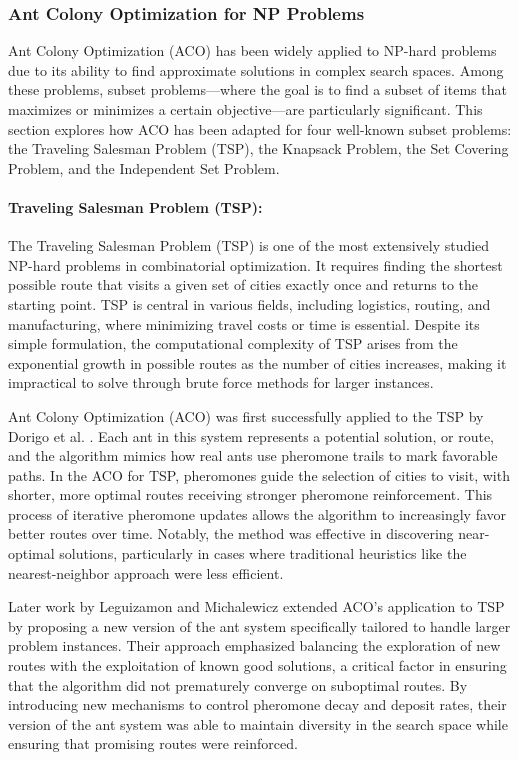 \subsubsection*{Ant Colony Optimization for NP Problems}
Ant Colony Optimization (ACO) has been widely applied to NP-hard problems due to its ability to find approximate solutions in complex search spaces. Among these problems, subset problems—where the goal is to find a subset of items that maximizes or minimizes a certain objective—are particularly significant. This section explores how ACO has been adapted for four well-known subset problems: the Traveling Salesman Problem (TSP), the Knapsack Problem, the Set Covering Problem, and the Independent Set Problem.

\paragraph{Traveling Salesman Problem (TSP):}
The Traveling Salesman Problem (TSP) is one of the most extensively studied NP-hard problems in combinatorial optimization. It requires finding the shortest possible route that visits a given set of cities exactly once and returns to the starting point. TSP is central in various fields, including logistics, routing, and manufacturing, where minimizing travel costs or time is essential. Despite its simple formulation, the computational complexity of TSP arises from the exponential growth in possible routes as the number of cities increases, making it impractical to solve through brute force methods for larger instances.

Ant Colony Optimization (ACO) was first successfully applied to the TSP by Dorigo et al. \cite{Dorigo2004}. Each ant in this system represents a potential solution, or route, and the algorithm mimics how real ants use pheromone trails to mark favorable paths. In the ACO for TSP, pheromones guide the selection of cities to visit, with shorter, more optimal routes receiving stronger pheromone reinforcement. This process of iterative pheromone updates allows the algorithm to increasingly favor better routes over time. Notably, the method was effective in discovering near-optimal solutions, particularly in cases where traditional heuristics like the nearest-neighbor approach were less efficient.

Later work by Leguizamon and Michalewicz \cite{Leguizamon1999} extended ACO's application to TSP by proposing a new version of the ant system specifically tailored to handle larger problem instances. Their approach emphasized balancing the exploration of new routes with the exploitation of known good solutions, a critical factor in ensuring that the algorithm did not prematurely converge on suboptimal routes. By introducing new mechanisms to control pheromone decay and deposit rates, their version of the ant system was able to maintain diversity in the search space while ensuring that promising routes were reinforced.

